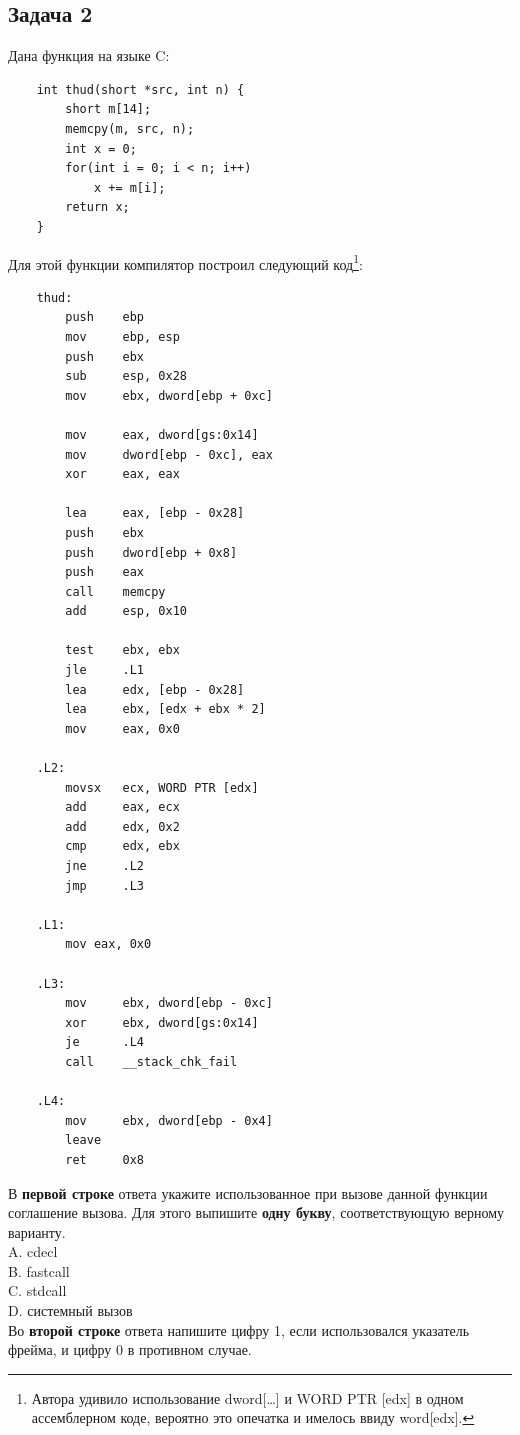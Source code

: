 \documentclass[12pt, letterpaper]{article}
\begin{document}
\subsection{Задача 2}
Дана функция на языке C:
\begin{verbatim}
    int thud(short *src, int n) {
        short m[14];
        memcpy(m, src, n);
        int x = 0;
        for(int i = 0; i < n; i++)
            x += m[i];
        return x;
    }
\end{verbatim}
Для этой функции компилятор построил следующий код\footnote{Автора удивило использование dword[\dots] и WORD PTR [edx] в одном ассемблерном коде, вероятно это опечатка и имелось ввиду word[edx].}:
\begin{verbatim}
    thud:
        push    ebp
        mov     ebp, esp
        push    ebx
        sub     esp, 0x28
        mov     ebx, dword[ebp + 0xc]
    
        mov     eax, dword[gs:0x14]
        mov     dword[ebp - 0xc], eax
        xor     eax, eax
    
        lea     eax, [ebp - 0x28]
        push    ebx
        push    dword[ebp + 0x8]
        push    eax
        call    memcpy
        add     esp, 0x10
    
        test    ebx, ebx
        jle     .L1
        lea     edx, [ebp - 0x28]
        lea     ebx, [edx + ebx * 2]
        mov     eax, 0x0
    
    .L2:
        movsx   ecx, WORD PTR [edx]
        add     eax, ecx
        add     edx, 0x2
        cmp     edx, ebx
        jne     .L2
        jmp     .L3
    
    .L1:
        mov eax, 0x0
    
    .L3:
        mov     ebx, dword[ebp - 0xc]
        xor     ebx, dword[gs:0x14]
        je      .L4
        call    __stack_chk_fail
    
    .L4:
        mov     ebx, dword[ebp - 0x4]
        leave
        ret     0x8
\end{verbatim}
В \textbf{первой строке} ответа укажите использованное при вызове данной функции соглашение вызова. Для этого выпишите \textbf{одну букву}, соответствующую верному варианту.\\
A. cdecl\\
B. fastcall\\
C. stdcall\\
D. системный вызов\\

Во \textbf{второй строке} ответа напишите цифру 1, если использовался указатель фрейма, и цифру 0 в противном случае.\\
\end{document}
